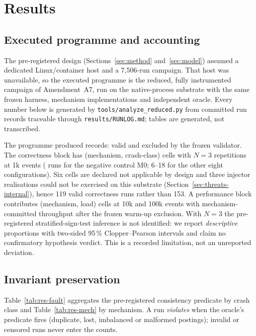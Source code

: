 \section{Results}
\label{sec:results}

\subsection{Executed programme and accounting}
\label{sec:results:programme}

The pre-registered design (Sections~\ref{sec:method} and~\ref{sec:model}) assumed a dedicated
Linux/container host and a 7,506-run campaign. That host was unavailable, so the executed programme
is the reduced, fully instrumented campaign of Amendment~A7, run on the native-process substrate
with the same frozen harness, mechanism implementations and independent oracle. Every number below
is generated by \texttt{tools/analyze\_reduced.py} from committed run records traceable through
\texttt{results/RUNLOG.md}; tables are generated, not transcribed.

The programme produced \ResTotalRecords{} records: \ResTotalValidRuns{} valid and
\ResTotalExcludedRuns{} excluded by the frozen validator. The correctness block has
\ResStageACells{} (mechanism, crash-class) cells with $N=3$ repetitions at 1k events
(\ResMechMZeroValidRuns{} runs for the negative control M0; 6--18 for the other eight
configurations). Six cells are declared not applicable by design and three injector realisations
could not be exercised on this substrate (Section~\ref{sec:threats-internal}), hence 119 valid
correctness runs rather than 153. A performance block contributes \ResPerfCells{}
(mechanism, load) cells at 10k and 100k events with mechanism-committed throughput after the frozen
warm-up exclusion. With $N=3$ the pre-registered stratified-sign-test inference is not identified:
we report \emph{descriptive} proportions with two-sided 95\,\% Clopper--Pearson intervals and claim
no confirmatory hypothesis verdict. This is a recorded limitation, not an unreported deviation.

\subsection{Invariant preservation}

Table~\ref{tab:res-fault} aggregates the pre-registered consistency predicate by crash class and
Table~\ref{tab:res-mech} by mechanism. A run \emph{violates} when the oracle's predicate fires
(duplicate, lost, imbalanced or malformed postings); invalid or censored runs never enter the
counts.

